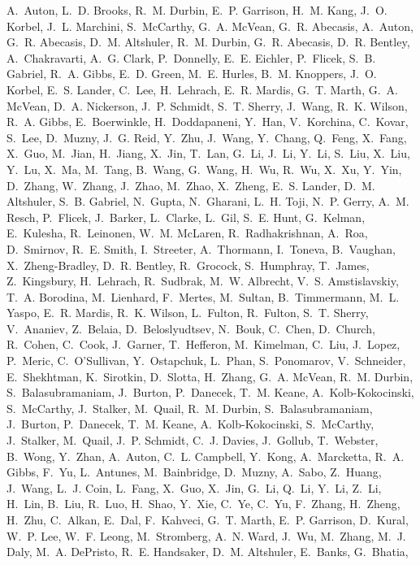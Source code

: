 \documentclass[webpdf,contemporary,large,single]{oup-authoring-template}%
\theoremstyle{thmstyleone}%
\theoremstyle{thmstyletwo}%
\theoremstyle{thmstylethree}%
\begin{document}
\begin{thebibliography}{10}
A.~Auton, L.~D. Brooks, R.~M. Durbin, E.~P. Garrison, H.~M. Kang, J.~O. Korbel,
  J.~L. Marchini, S.~McCarthy, G.~A. McVean, G.~R. Abecasis, A.~Auton, G.~R.
  Abecasis, D.~M. Altshuler, R.~M. Durbin, G.~R. Abecasis, D.~R. Bentley,
  A.~Chakravarti, A.~G. Clark, P.~Donnelly, E.~E. Eichler, P.~Flicek, S.~B.
  Gabriel, R.~A. Gibbs, E.~D. Green, M.~E. Hurles, B.~M. Knoppers, J.~O.
  Korbel, E.~S. Lander, C.~Lee, H.~Lehrach, E.~R. Mardis, G.~T. Marth, G.~A.
  McVean, D.~A. Nickerson, J.~P. Schmidt, S.~T. Sherry, J.~Wang, R.~K. Wilson,
  R.~A. Gibbs, E.~Boerwinkle, H.~Doddapaneni, Y.~Han, V.~Korchina, C.~Kovar,
  S.~Lee, D.~Muzny, J.~G. Reid, Y.~Zhu, J.~Wang, Y.~Chang, Q.~Feng, X.~Fang,
  X.~Guo, M.~Jian, H.~Jiang, X.~Jin, T.~Lan, G.~Li, J.~Li, Y.~Li, S.~Liu,
  X.~Liu, Y.~Lu, X.~Ma, M.~Tang, B.~Wang, G.~Wang, H.~Wu, R.~Wu, X.~Xu, Y.~Yin,
  D.~Zhang, W.~Zhang, J.~Zhao, M.~Zhao, X.~Zheng, E.~S. Lander, D.~M.
  Altshuler, S.~B. Gabriel, N.~Gupta, N.~Gharani, L.~H. Toji, N.~P. Gerry,
  A.~M. Resch, P.~Flicek, J.~Barker, L.~Clarke, L.~Gil, S.~E. Hunt, G.~Kelman,
  E.~Kulesha, R.~Leinonen, W.~M. McLaren, R.~Radhakrishnan, A.~Roa, D.~Smirnov,
  R.~E. Smith, I.~Streeter, A.~Thormann, I.~Toneva, B.~Vaughan,
  X.~Zheng-Bradley, D.~R. Bentley, R.~Grocock, S.~Humphray, T.~James,
  Z.~Kingsbury, H.~Lehrach, R.~Sudbrak, M.~W. Albrecht, V.~S. Amstislavskiy,
  T.~A. Borodina, M.~Lienhard, F.~Mertes, M.~Sultan, B.~Timmermann, M.~L.
  Yaspo, E.~R. Mardis, R.~K. Wilson, L.~Fulton, R.~Fulton, S.~T. Sherry,
  V.~Ananiev, Z.~Belaia, D.~Beloslyudtsev, N.~Bouk, C.~Chen, D.~Church,
  R.~Cohen, C.~Cook, J.~Garner, T.~Hefferon, M.~Kimelman, C.~Liu, J.~Lopez,
  P.~Meric, C.~O'Sullivan, Y.~Ostapchuk, L.~Phan, S.~Ponomarov, V.~Schneider,
  E.~Shekhtman, K.~Sirotkin, D.~Slotta, H.~Zhang, G.~A. McVean, R.~M. Durbin,
  S.~Balasubramaniam, J.~Burton, P.~Danecek, T.~M. Keane, A.~Kolb-Kokocinski,
  S.~McCarthy, J.~Stalker, M.~Quail, R.~M. Durbin, S.~Balasubramaniam,
  J.~Burton, P.~Danecek, T.~M. Keane, A.~Kolb-Kokocinski, S.~McCarthy,
  J.~Stalker, M.~Quail, J.~P. Schmidt, C.~J. Davies, J.~Gollub, T.~Webster,
  B.~Wong, Y.~Zhan, A.~Auton, C.~L. Campbell, Y.~Kong, A.~Marcketta, R.~A.
  Gibbs, F.~Yu, L.~Antunes, M.~Bainbridge, D.~Muzny, A.~Sabo, Z.~Huang,
  J.~Wang, L.~J. Coin, L.~Fang, X.~Guo, X.~Jin, G.~Li, Q.~Li, Y.~Li, Z.~Li,
  H.~Lin, B.~Liu, R.~Luo, H.~Shao, Y.~Xie, C.~Ye, C.~Yu, F.~Zhang, H.~Zheng,
  H.~Zhu, C.~Alkan, E.~Dal, F.~Kahveci, G.~T. Marth, E.~P. Garrison, D.~Kural,
  W.~P. Lee, W.~F. Leong, M.~Stromberg, A.~N. Ward, J.~Wu, M.~Zhang, M.~J.
  Daly, M.~A. DePristo, R.~E. Handsaker, D.~M. Altshuler, E.~Banks, G.~Bhatia,

\end{thebibliography}
\end{document}
